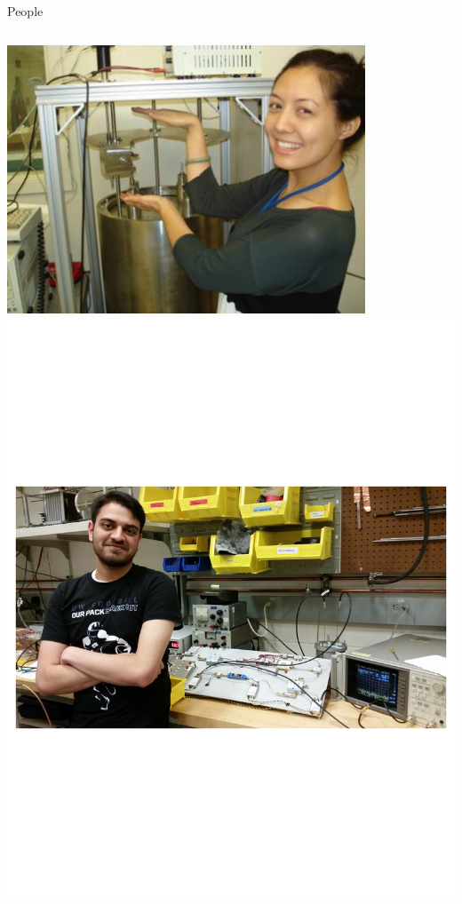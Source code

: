 \documentclass{beamer}
\begin{document}
\begin{frame}{People}
\begin{columns}
\includegraphics[width=0.8\textwidth]{lisa_pic}
\includegraphics[width=\textwidth]{kunal_pic}


\end{columns}
\end{frame}
\end{document}
